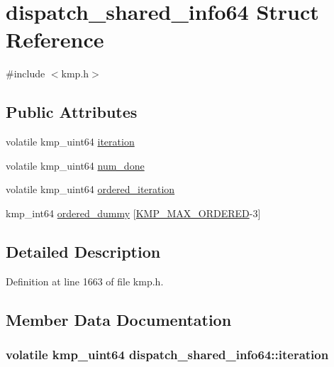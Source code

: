 \hypertarget{structdispatch__shared__info64}{\section{dispatch\-\_\-shared\-\_\-info64 Struct Reference}
\label{structdispatch__shared__info64}
}


{\ttfamily \#include $<$kmp.\-h$>$}

\subsection*{Public Attributes}
\begin{DoxyCompactItemize}
\item 
volatile kmp\-\_\-uint64 \hyperlink{structdispatch__shared__info64_a97a2317659784e7045310e2298b1188f}{iteration}
\item 
volatile kmp\-\_\-uint64 \hyperlink{structdispatch__shared__info64_a77495e337de2169cbb6f69849bcab4ca}{num\-\_\-done}
\item 
volatile kmp\-\_\-uint64 \hyperlink{structdispatch__shared__info64_aeeadb332311f2be435d7e88e1c0ee23a}{ordered\-\_\-iteration}
\item 
kmp\-\_\-int64 \hyperlink{structdispatch__shared__info64_aec78587b0a9d5e09f8347079e7101a16}{ordered\-\_\-dummy} \mbox{[}\hyperlink{kmp_8h_ab5cc9eb736cfbc3fe74fc2324c0b19be}{K\-M\-P\-\_\-\-M\-A\-X\-\_\-\-O\-R\-D\-E\-R\-E\-D}-\/3\mbox{]}
\end{DoxyCompactItemize}


\subsection{Detailed Description}


Definition at line 1663 of file kmp.\-h.



\subsection{Member Data Documentation}
\hypertarget{structdispatch__shared__info64_a97a2317659784e7045310e2298b1188f}{
\subsubsection[{iteration}]{\setlength{\rightskip}{0pt plus 5cm}volatile kmp\-\_\-uint64 dispatch\-\_\-shared\-\_\-info64\-::iteration}}\label{structdispatch__shared__info64_a97a2317659784e7045310e2298b1188f}


